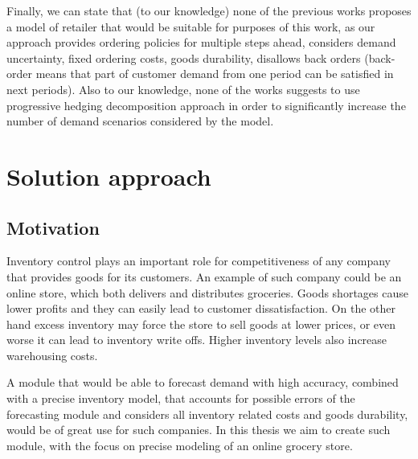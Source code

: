\documentclass[11pt,a4paper]{article}
\begin{document}
Finally, we can state that (to our knowledge) none of the previous works proposes a model of retailer that would be suitable for purposes of this work, as our approach provides ordering policies for multiple steps ahead, considers demand uncertainty, fixed ordering costs,
goods durability, disallows back orders (back-order means that part of customer demand from one period can be satisfied in next periods). Also to our knowledge, none of the works suggests to use progressive hedging decomposition approach in order to significantly increase the number of demand scenarios considered by the model.

\newpage
\section{Solution approach}
\label{sec:approach}

\subsection{Motivation}
Inventory control plays an important role for competitiveness of any company that provides goods for its customers. An example of such company could be an online store, which both delivers and distributes groceries. Goods shortages cause lower profits and they can easily lead to customer dissatisfaction. On the other hand excess inventory may force the store to sell goods at lower prices, or even worse it can lead to inventory write offs. Higher inventory levels also increase warehousing costs.

A module that would be able to forecast demand with high accuracy, combined with a precise inventory model, that accounts for possible errors of the forecasting module and considers all inventory related costs and goods durability, would be of great use for such companies. In this thesis we aim to create such module, with the focus on precise modeling of an online grocery store.
\end{document}
